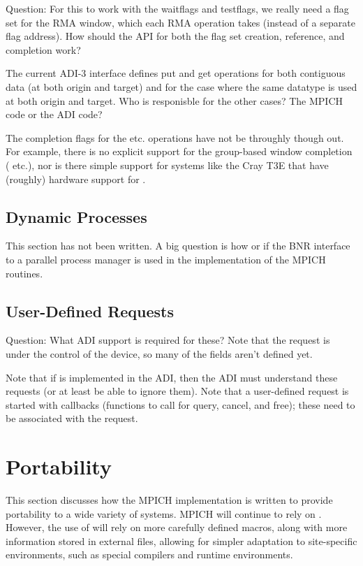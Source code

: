 \documentclass{article}
\begin{document}
Question:  For this to work with the waitflags and testflags, we
really need a flag set for the RMA window, which each RMA operation
takes (instead of a separate flag address).  How should the API for
both the flag set creation, reference, and completion work?  

The current ADI-3 interface defines put and get operations for both
contiguous data (at both origin and target) and for the case where the
same datatype is used at both origin and target.  Who is responisble
for the other cases?  The MPICH code or the ADI code?

The completion flags for the  etc. operations
have not be throughly though out.  For example, there is no explicit
support for the group-based window completion (
etc.), nor is there simple support for systems like the Cray T3E that
have (roughly) hardware support for .

\subsection{Dynamic Processes}

This section has not been written.  A big question is how or if the BNR
interface to a parallel process manager is used in the implementation
of the MPICH routines.  

\subsection{User-Defined Requests}

Question:  What ADI support is required for these?  Note that the
request is under the control of the device, so many of the fields
aren't defined yet.

Note that if  is implemented in the ADI, then the
ADI must understand these requests (or at least be able to ignore
them).
Note that a user-defined request is started with callbacks (functions
to call for query, cancel, and free); these need to be associated with
the request.  

\section{Portability}

This section discusses how the MPICH implementation is written to
provide portability to a wide variety of systems.  MPICH will continue
to rely on .  However, the use of 
will rely on more carefully defined macros, along with more
information stored in external files, allowing for simpler adaptation
to site-specific environments, such as special compilers and runtime
environments. 
\end{document}
